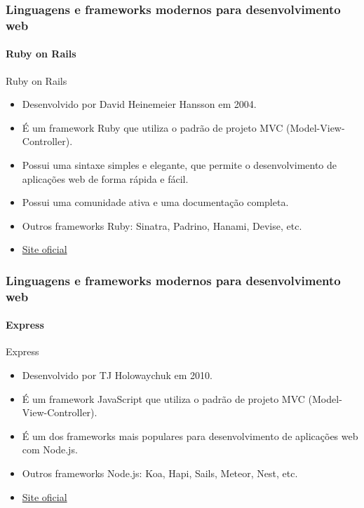 \documentclass[
	9pt, %
	t, %
]{beamer}
\newcommand{\iconLink}[2]{\href{#1}{\faLink \hspace{0.2em} {#2}}}
\begin{document}
\begin{frame}
	\frametitle{Linguagens e frameworks modernos para desenvolvimento web}
	\framesubtitle{Ruby on Rails}

	\begin{block}{Ruby on Rails}
		\begin{itemize}
			\item Desenvolvido por David Heinemeier Hansson em 2004. 
			\item É um framework Ruby que utiliza o padrão de projeto MVC (Model-View-Controller).
			\item Possui uma sintaxe simples e elegante, que permite o desenvolvimento de aplicações web de forma rápida e fácil.
			\item Possui uma comunidade ativa e uma documentação completa.
			\item Outros frameworks Ruby: Sinatra, Padrino, Hanami, Devise, etc.
			\item \iconLink{https://rubyonrails.org/}{Site oficial}
		\end{itemize}
	\end{block}

\end{frame}

\begin{frame}
	\frametitle{Linguagens e frameworks modernos para desenvolvimento web}
	\framesubtitle{Express}

	\begin{block}{Express}
		\begin{itemize}
			\item Desenvolvido por TJ Holowaychuk em 2010. 
			\item É um framework JavaScript que utiliza o padrão de projeto MVC (Model-View-Controller).
			\item É um dos frameworks mais populares para desenvolvimento de aplicações web com Node.js.
			\item Outros frameworks Node.js: Koa, Hapi, Sails, Meteor, Nest, etc.
			\item \iconLink{https://expressjs.com/}{Site oficial}
		\end{itemize}
	\end{block}

\end{frame}
\end{document}
